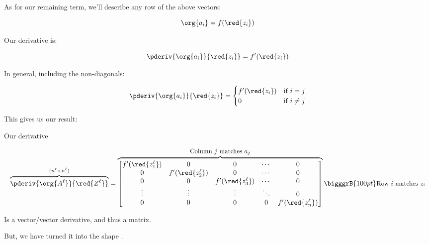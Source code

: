         As for our remaining term, we'll describe any row of the above vectors:
        
        \begin{equation}
            \org{a_i} = f(\red{z_i})
        \end{equation}
        
        Our derivative is:
        
        \begin{equation}
            \pderiv { \org{a_i} }{ \red{z_i} }  = f'(\red{z_i})
        \end{equation}
        
        In general, including the non-diagonals:
        
        \begin{equation}
            \pderiv { \org{a_i} }{ \red{z_i} }
            = 
            \begin{cases}
              f'(\red{z_i}) & \text{if } i = j\\
              0 & \text{if } i \neq j
            \end{cases}
        \end{equation}
        
        This gives us our result:\\

        \begin{notation}
            Our derivative
            
            \begin{equation}
                \overbrace{
                    \pderiv {\org{A^\ell}}   {\red{Z^\ell}}
                }^{ (n^{\ell} \times n^{\ell}) }
                =
                \overbrace{
                    \begin{bmatrix}
                        f'({\red{z_1^\ell}})&0                   &0                   &\cdots  & 0 \\
                        0                   &f'({\red{z_2^\ell}})&0                   &\cdots  & 0 \\
                        0                   &0                   &f'({\red{z_3^\ell}})&\cdots  & 0 \\
                        \vdots              &\vdots              &\vdots              &\ddots  & 0 \\
                        0                   &0                   &0                   &0   &f'({\red{z_n^\ell}})
                    \end{bmatrix}
                }^{ \text{\small Column $j$ matches $a_j$} }
                \bigggrB{100pt} \text{\small Row $i$ matches $z_i$} 
            \end{equation}
        
            Is a vector/vector derivative, and thus a matrix.
            
            But, we have turned it into the shape .
        \end{notation}
    

